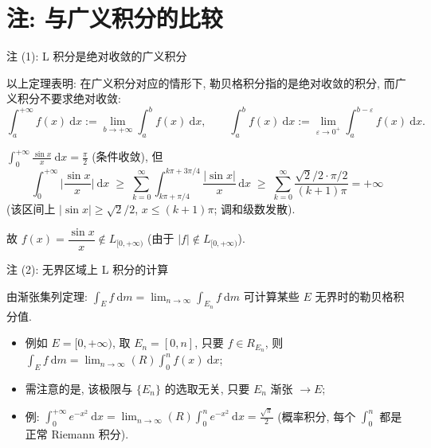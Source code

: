 
\section[广义积分]{注: 与广义积分的比较}


\begin{frame}{注 (1): L 积分是绝对收敛的广义积分}

以上定理表明: 在广义积分对应的情形下, \alert{勒贝格积分指的是绝对收敛的积分},
而广义积分\alert{不要求}绝对收敛:
\[
\int_a^{+\infty} f(x) ~ \mathrm{d} x := \lim_{b \to +\infty} \int_a^b f(x) ~ \mathrm{d} x,
\qquad
\int_a^b f(x) ~ \mathrm{d} x := \lim_{\varepsilon \to 0^+} \int_a^{b - \varepsilon} f(x) ~ \mathrm{d} x .
\]

\pause

\begin{eg}
$\displaystyle \int_0^{+\infty} \frac{\sin x}{x} ~ \mathrm{d} x = \frac{\pi}{2}$ (条件收敛), 但
\[
\int_0^{+\infty} \Big| \frac{\sin x}{x} \Big| ~ \mathrm{d} x
\;\geqslant\; \sum_{k=0}^{\infty} \int_{k\pi + \pi/4}^{k\pi + 3\pi/4} \frac{|\sin x|}{x}\, \mathrm{d} x
\;\geqslant\; \sum_{k=0}^{\infty} \frac{\sqrt{2}/2 \cdot \pi/2}{(k+1)\pi}
= +\infty
\]
(该区间上 $|\sin x| \geqslant \sqrt{2}/2$, $x \leqslant (k+1)\pi$; 调和级数发散).
\end{eg}

故 $f(x) = \dfrac{\sin x}{x} \notin L_{[0, +\infty)}$
(由于 $|f| \notin L_{[0, +\infty)}$).

\end{frame}


\begin{frame}{注 (2): 无界区域上 L 积分的计算}

由渐张集列定理: $\displaystyle \int_E f ~ \mathrm{d} m = \lim_{n \to \infty} \int_{E_n} f ~ \mathrm{d} m$
可计算某些 $E$ \alert{无界}时的勒贝格积分值.

\begin{itemize}
\item 例如 $E = [0, +\infty)$, 取 $E_n = [0, n]$, 只要 $f \in R_{E_n}$, 则
  $\displaystyle \int_E f ~ \mathrm{d} m = \lim_{n \to \infty} (R) \int_0^n f(x) ~ \mathrm{d} x$;
\item \alert{需注意的是}, 该极限与 $\{E_n\}$ 的选取无关, 只要 $E_n$ 渐张 $\to E$;
\graymode
\item 例: $\displaystyle \int_0^{+\infty} e^{-x^2} ~ \mathrm{d} x
= \lim_{n \to \infty} (R) \int_0^n e^{-x^2} ~ \mathrm{d} x = \frac{\sqrt{\pi}}{2}$
  (概率积分, 每个 $\int_0^n$ 都是正常 Riemann 积分).
\normalmode
\end{itemize}

\end{frame}

